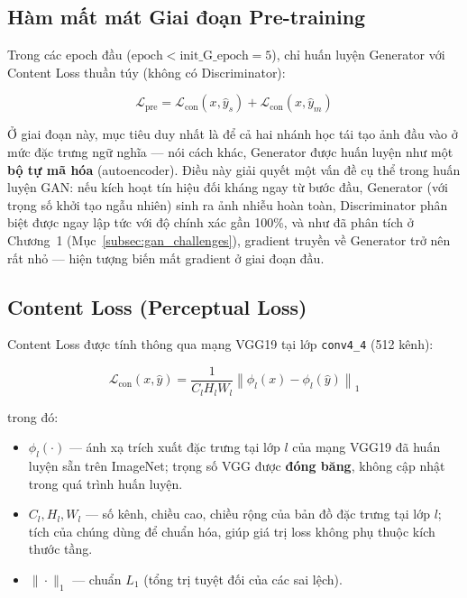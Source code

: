 
\subsection{Hàm mất mát Giai đoạn Pre-training}
\label{subsec:pretrain_loss}

Trong các epoch đầu ($\text{epoch} < \text{init\_G\_epoch} = 5$), chỉ huấn luyện Generator với Content Loss thuần túy (không có Discriminator):

\begin{equation}
\label{eq:pretrain_loss}
\mathcal{L}_{\text{pre}} = \mathcal{L}_{\text{con}}(x, \widehat{y}_s) + \mathcal{L}_{\text{con}}(x, \widehat{y}_m)
\end{equation}

Ở giai đoạn này, mục tiêu duy nhất là để cả hai nhánh học tái tạo ảnh đầu vào ở mức đặc trưng ngữ nghĩa --- nói cách khác, Generator được huấn luyện như một \textbf{bộ tự mã hóa} (autoencoder). Điều này giải quyết một vấn đề cụ thể trong huấn luyện GAN: nếu kích hoạt tín hiệu đối kháng ngay từ bước đầu, Generator (với trọng số khởi tạo ngẫu nhiên) sinh ra ảnh nhiễu hoàn toàn, Discriminator phân biệt được ngay lập tức với độ chính xác gần 100\%, và như đã phân tích ở Chương~1 (Mục~\ref{subsec:gan_challenges}), gradient truyền về Generator trở nên rất nhỏ --- hiện tượng biến mất gradient ở giai đoạn đầu.

\subsection{Content Loss (Perceptual Loss)}
\label{subsec:content_loss}

Content Loss được tính thông qua mạng VGG19 \cite{Simonyan2015} tại lớp \texttt{conv4\_4} (512 kênh):

\begin{equation}
\label{eq:content_loss}
\mathcal{L}_{\text{con}}(x, \widehat{y}) = \frac{1}{C_l H_l W_l} \left\| \phi_l(x) - \phi_l(\widehat{y}) \right\|_1
\end{equation}

\noindent trong đó:
\begin{itemize}
    \item $\phi_l(\cdot)$ --- ánh xạ trích xuất đặc trưng tại lớp $l$ của mạng VGG19 đã huấn luyện sẵn trên ImageNet; trọng số VGG được \textbf{đóng băng}, không cập nhật trong quá trình huấn luyện.
    \item $C_l, H_l, W_l$ --- số kênh, chiều cao, chiều rộng của bản đồ đặc trưng tại lớp $l$; tích của chúng dùng để chuẩn hóa, giúp giá trị loss không phụ thuộc kích thước tầng.
    \item $\|\cdot\|_1$ --- chuẩn $L_1$ (tổng trị tuyệt đối của các sai lệch).
\end{itemize}

